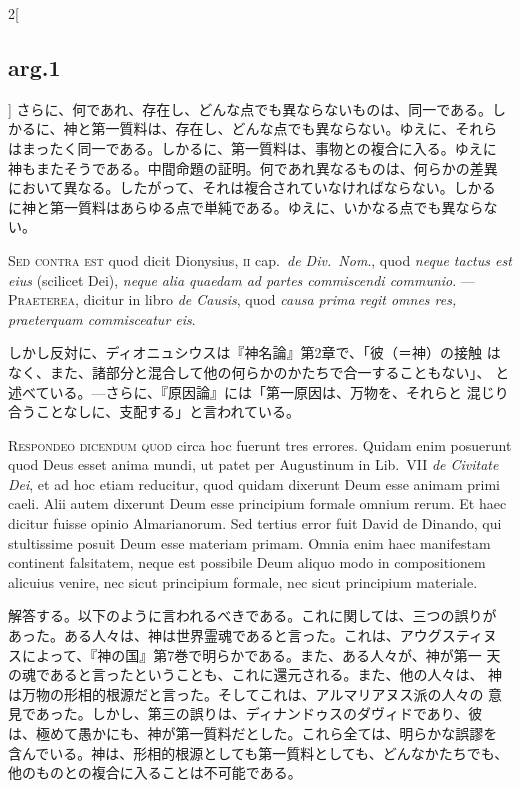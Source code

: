 \documentclass[paper=a4paper,fontsize=10pt,jafontsize=9pt,titlepage]{jlreq}
\begin{document}
\begin{paracol}{2}[\subsection{arg.1}]
さらに、何であれ、存在し、どんな点でも異ならないものは、同一である。し
かるに、神と第一質料は、存在し、どんな点でも異ならない。ゆえに、それら
はまったく同一である。しかるに、第一質料は、事物との複合に入る。ゆえに
神もまたそうである。中間命題の証明。何であれ異なるものは、何らかの差異
において異なる。したがって、それは複合されていなければならない。しかる
に神と第一質料はあらゆる点で単純である。ゆえに、いかなる点でも異ならな
い。

\switchcolumn*[\subsection{s.c.}]

{\scshape Sed contra est} quod dicit Dionysius, {\scshape ii}
 cap.~{\itshape de Div.~Nom}., quod {\itshape neque tactus est eius}
 (scilicet Dei), {\itshape neque alia quaedam ad partes commiscendi
 communio}. --- {\scshape Praeterea}, dicitur in libro {\itshape de
 Causis}, quod {\itshape causa prima regit omnes res, praeterquam
 commisceatur eis}.

\switchcolumn

しかし反対に、ディオニュシウスは『神名論』第2章で、「彼（＝神）の接触
はなく、また、諸部分と混合して他の何らかのかたちで合一することもない」、
と述べている。---さらに、『原因論』には「第一原因は、万物を、それらと
混じり合うことなしに、支配する」と言われている。


{\scshape Respondeo dicendum quod} circa hoc fuerunt tres
 errores. Quidam enim posuerunt quod Deus esset anima mundi, ut patet
 per Augustinum in Lib.~VII {\itshape de Civitate Dei}, et ad hoc
 etiam reducitur, quod quidam dixerunt Deum esse animam primi caeli.
 Alii autem dixerunt Deum esse principium formale omnium rerum. Et
 haec dicitur fuisse opinio Almarianorum.  Sed tertius error fuit
 David de Dinando, qui stultissime posuit Deum esse materiam primam.
 Omnia enim haec manifestam continent falsitatem, neque est possibile
 Deum aliquo modo in compositionem alicuius venire, nec sicut
 principium formale, nec sicut principium materiale.

\switchcolumn

解答する。以下のように言われるべきである。これに関しては、三つの誤りが
あった。ある人々は、神は世界霊魂であると言った。これは、アウグスティヌ
スによって、『神の国』第7巻で明らかである。また、ある人々が、神が第一
天の魂であると言ったということも、これに還元される。また、他の人々は、
神は万物の形相的根源だと言った。そしてこれは、アルマリアヌス派の人々の
意見であった。しかし、第三の誤りは、ディナンドゥスのダヴィドであり、彼
は、極めて愚かにも、神が第一質料だとした。これら全ては、明らかな誤謬を
含んでいる。神は、形相的根源としても第一質料としても、どんなかたちでも、
他のものとの複合に入ることは不可能である。


\end{paracol}
\end{document}
